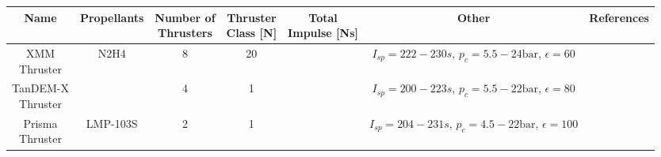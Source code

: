 \documentclass[12pt]{article}
\begin{document}
\newpage
\begin{adjustbox}{angle=90, center,caption={Overview of small propulsion systems using monopropellants.},float=table}
	\begin{tabular}{|c|c|c|c|c|c|c|}
		\hline
		Name & Propellants & \makecell{Number of\\Thrusters} & \makecell{Thruster\\Class {[}N{]}} & \makecell{Total\\Impulse [Ns]} & Other & References\\ \hline
		
		\makecell{XMM\\Thruster} & N2H4 & 8 & 20 & \makecell{$>517000$}  & \makecell{$I_{sp}=222-230s$,\\$p_c=5.5-24\text{bar}$,\\$\epsilon=60$} & \makecell{ \cite{EsaXMM} \cite{ariane20N}} \\ \hline
		
		\makecell{TanDEM-X\\Thruster} & \makecell{N2H4} & 4 & 1 & \makecell{$>135000$}& \makecell{$I_{sp}=200-223s$,\\$p_c=5.5-22\text{bar}$,\\$\epsilon=80$\\} & \makecell{\cite{tandemX} \cite{ariane1N}}\\ \hline
		
		\makecell{Prisma\\Thruster}& LMP-103S & 2 & 1 & \makecell{$\approx 108773$} & \makecell{$I_{sp}=204-231s$,\\$p_c=4.5-22\text{bar}$,\\$\epsilon=100$} & \cite{hpgpThruster} \\ \hline
	\end{tabular}
	\label{tab:reference}
\end{adjustbox}

\newpage
\printbibliography 
 
\end{document}
